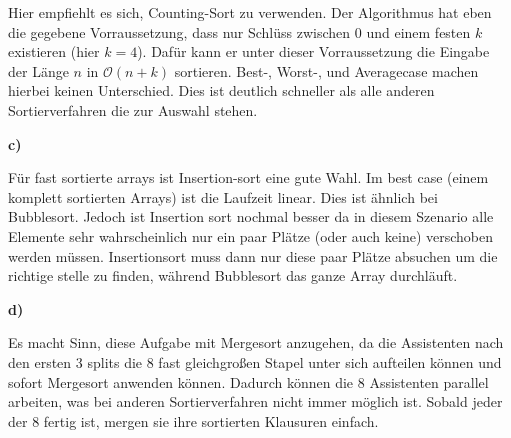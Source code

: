 \documentclass[a4paper,graphics,11pt]{article}
\begin{document}
Hier empfiehlt es sich, Counting-Sort zu verwenden. Der Algorithmus hat eben die gegebene Vorraussetzung, dass
nur Schlüss zwischen $0$ und einem festen $k$ existieren (hier $k=4$). Dafür kann er unter dieser Vorraussetzung
die Eingabe der Länge $n$ in $\mathcal{O}(n+k)$ sortieren. Best-, Worst-, und Averagecase machen hierbei keinen Unterschied.
Dies ist deutlich schneller als alle anderen Sortierverfahren die zur Auswahl stehen.

\textbf{c)}

Für fast sortierte arrays ist Insertion-sort eine gute Wahl. Im best case (einem komplett sortierten Arrays)
ist die Laufzeit linear. Dies ist ähnlich bei Bubblesort. Jedoch ist Insertion sort nochmal besser da
in diesem Szenario alle Elemente sehr wahrscheinlich nur ein paar Plätze (oder auch keine) verschoben werden
müssen. Insertionsort muss dann nur diese paar Plätze absuchen um die richtige stelle zu finden, während Bubblesort
das ganze Array durchläuft.

\textbf{d)}

Es macht Sinn, diese Aufgabe mit Mergesort anzugehen, da die Assistenten nach den ersten 3 splits die 8 fast gleichgroßen
Stapel unter sich aufteilen können und sofort Mergesort anwenden können. Dadurch können die 8 Assistenten parallel arbeiten,
was bei anderen Sortierverfahren nicht immer möglich ist. Sobald jeder der 8 fertig ist, mergen sie ihre sortierten Klausuren
einfach.
\end{document}
